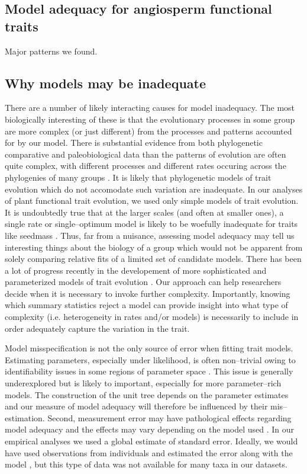 \documentclass[a4paper,12pt]{article}
\begin{document}
\subsection{Model adequacy for angiosperm functional traits}
Major patterns we found.

\subsection*{Why models may be inadequate}
There are a number of likely interacting causes for model inadequacy. The most biologically interesting of these is that the evolutionary processes in some group are more complex (or just different) from the processes and patterns accounted for by our model.  There is substantial evidence from both phylogenetic comparative and paleobiological data than the patterns of evolution are often quite complex, with different processes and different rates occuring across the phylogenies of many groups \citep{Foote1997, Grey2008, Hunt2012, Hopkins2012, PennellPE}. It is likely that phylogenetic models of trait evolution which do not accomodate such variation are inadequate. In our analyses of plant functional trait evolution, we used only simple models of trait evolution. It is undoubtedly true that at the larger scales (and often at smaller ones), a single rate or single--optimum model is likely to be woefully inadequate for traits like seedmass \citep{Moles2005}. Thus, far from a nuisance, assessing model adequacy may tell us interesting things about the biology of a group which would not be apparent from solely comparing relative fits of a limited set of candidate models. There has been a lot of progress recently in the developement of more sophisticated and parameterized models of trait evolution \citep{ButlerKing2004, Omeara2006, FitzJohn2010, Eastman2011, Venditti2011, Revell2012, Beaulieu2012}. Our approach can help researchers decide when it is necessary to invoke further complexity. Importantly, knowing which summary statistics reject a model can provide insight into what type of complexity (i.e. heterogeneity in rates and/or models) is necessarily to include in order adequately capture the variation in the trait.

Model misspecification is not the only source of error when fitting trait models. Estimating parameters, especially under likelihood, is often non--trivial owing to identifiability issues in some regions of parameter space \citep{Ane2008, HoAne2012}. This issue is generally underexplored but is likely to important, especially for more parameter--rich models. The construction of the unit tree depends on the parameter estimates and our measure of model adequacy will therefore be influenced by their mis--estimation. Second, measurement error may have pathological effects regarding model adequacy and the effects may vary depending on the model used \citep{PennellPE}. In our empirical analyses we used a global estimate of standard error. Ideally, we would have used observations from individuals and estimated the error along with the model \citep{Ives2007, Felsenstein2008,  Hansen2012}, but this type of data was not available for many taxa in our datasets. 
\end{document}
